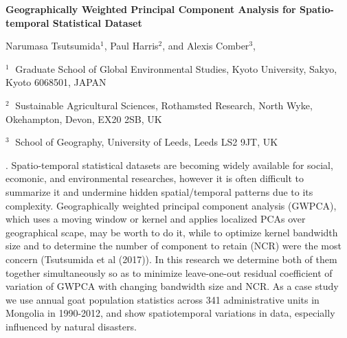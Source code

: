 \documentclass[12pt]{article}
\begin{document}
\begin{flushleft}


{\LARGE\bf Geographically Weighted Principal Component Analysis for Spatio-temporal Statistical Dataset}


\vspace{1.0cm}

Narumasa Tsutsumida$^1$, Paul Harris$^2$,  and Alexis Comber$^3$, 

\begin{description}

\item $^1 \;$ Graduate School of Global Environmental Studies, Kyoto University,
Sakyo, Kyoto 6068501, JAPAN

\item $^2 \;$ Sustainable Agricultural Sciences, Rothamsted Research, North Wyke, Okehampton, Devon, EX20 2SB, UK

\item $^3 \;$ School of Geography, University of Leeds, Leeds LS2 9JT, UK


\end{description}

\end{flushleft}


\vspace{0.75cm}

.  Spatio-temporal statistical datasets are becoming widely available for social, ecomonic, and environmental researches, however it is often difficult to summarize it and undermine hidden spatial/temporal patterns due to its complexity. Geographically weighted principal component analysis (GWPCA), which uses a moving window or kernel and applies localized PCAs over geographical scape, may be worth to do it, while to optimize kernel bandwidth size and to determine the number of component to retain (NCR) were the most concern (Tsutsumida et al (2017)). In this research we determine both of them together simultaneously so as to minimize leave-one-out residual coefficient of variation of GWPCA with changing bandwidth size and NCR.  As a case study we use annual goat population statistics across 341 administrative units in Mongolia in 1990-2012,  and show  spatiotemporal variations in data, especially influenced by natural disasters. 

\vskip 2mm
\end{document}
